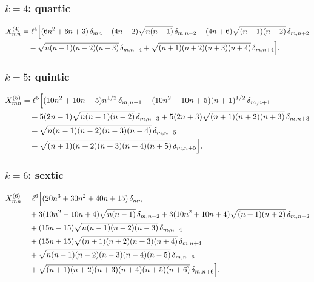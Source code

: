 \subsubsection{\texorpdfstring{$k=4$}{k=4}: quartic}

\begin{align}\label{eq:X4}
  X^{(4)}_{mn}
  &= \ell^4\Bigl[(6n^2+6n+3)\,\delta_{mn}
    + (4n-2)\sqrt{n(n-1)}\,\delta_{m,n-2}
    + (4n+6)\sqrt{(n+1)(n+2)}\,\delta_{m,n+2} \nonumber\\
  &\quad +\sqrt{n(n-1)(n-2)(n-3)}\,\delta_{m,n-4}
    +\sqrt{(n+1)(n+2)(n+3)(n+4)}\,\delta_{m,n+4}\Bigr].
\end{align}

\subsubsection{\texorpdfstring{$k=5$}{k=5}: quintic}

\begin{align}\label{eq:X5}
  X^{(5)}_{mn}
  &= \ell^5\Bigl[(10n^2+10n+5)n^{1/2}\,\delta_{m,n-1}
              + (10n^2+10n+5)(n+1)^{1/2}\,\delta_{m,n+1} \nonumber\\
  &\quad + 5(2n-1)\sqrt{n(n-1)(n-2)}\,\delta_{m,n-3}
    + 5(2n+3)\sqrt{(n+1)(n+2)(n+3)}\,\delta_{m,n+3} \nonumber\\
  &\quad + \sqrt{n(n-1)(n-2)(n-3)(n-4)}\,\delta_{m,n-5} \nonumber\\
  &\quad + \sqrt{(n+1)(n+2)(n+3)(n+4)(n+5)}\,\delta_{m,n+5}\Bigr].
\end{align}

\subsubsection{\texorpdfstring{$k=6$}{k=6}: sextic}

\begin{align}\label{eq:X6}
  X^{(6)}_{mn}
  &= \ell^6\Bigl[(20n^3+30n^2+40n+15)\,\delta_{mn} \nonumber\\
  &\quad + 3(10n^2-10n+4)\sqrt{n(n-1)}\,\delta_{m,n-2}
    + 3(10n^2+10n+4)\sqrt{(n+1)(n+2)}\,\delta_{m,n+2} \nonumber\\
  &\quad + (15n-15)\sqrt{n(n-1)(n-2)(n-3)}\,\delta_{m,n-4} \nonumber\\
  &\quad + (15n+15)\sqrt{(n+1)(n+2)(n+3)(n+4)}\,\delta_{m,n+4} \nonumber\\
  &\quad + \sqrt{n(n-1)(n-2)(n-3)(n-4)(n-5)}\,\delta_{m,n-6} \nonumber\\
  &\quad + \sqrt{(n+1)(n+2)(n+3)(n+4)(n+5)(n+6)}\,\delta_{m,n+6}\Bigr].
\end{align}

